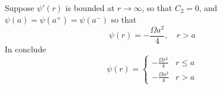 Suppose $\psi'(r)$ is bounded at $r\to \infty$, so that $C_2 = 0$, and $\psi(a) = \psi(a^{+}) = \psi(a^{-})$ so that 
\begin{equation}
\psi(r) = -\frac{\Omega a^2}{4} ,\quad r>a
\end{equation}
In conclude
\begin{equation}
\psi(r) =
\begin{cases}
\displaystyle -\frac{\Omega r^2}{4}& r\leq a\\
\displaystyle -\frac{\Omega a^2}{4}& r > a
\end{cases}
\end{equation}



